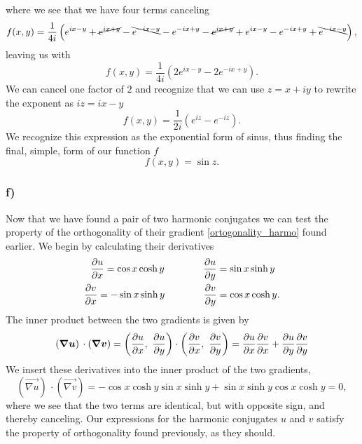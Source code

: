 \documentclass[12pt,twoside]{article}
\begin{document}
where we see that we have four terms canceling
\begin{equation}
  f(x, y) = \frac{1}{4i}\left(e^{ix-y}+\cancel{e^{ix+y}}-\bcancel{e^{-ix-y}}-e^{-ix+y} - \cancel{e^{ix+y}}+ e^{ix-y}-e^{-ix+y}+\bcancel{e^{-ix-y}}\right),
\end{equation}
leaving us with
\begin{equation}
  f(x, y) = \frac{1}{4i}\left(2e^{ix-y} - 2e^{-ix+y}\right).
\end{equation}
We can cancel one factor of $2$ and recognize that we can use $z=x+iy$ to rewrite the exponent as $iz=ix-y$
\begin{equation}
  f(x, y) = \frac{1}{2i}\left(e^{iz} - e^{-iz}\right).
\end{equation}
We recognize this expression as the exponential form of sinus, thus finding the final, simple, form of our function $f$
\begin{equation}
  f(x, y) = \sin{z}.
\end{equation}

\subsubsection*{f)}
Now that we have found a pair of two harmonic conjugates we can test the property of the orthogonality of their gradient \eqref{ortogonality_harmo} found earlier. We begin by calculating their derivatives
\begin{align}
  \begin{split}
  \pdv{u}{x} = \cos{x}\cosh{y}\qquad \qquad\pdv{u}{y} &= \sin{x}\sinh{y} \\
  \pdv{v}{x} = -\sin{x}\sinh{y}\qquad \qquad\pdv{v}{y} &= \cos{x}\cosh{y}. \label{derivatives_2}
\end{split}
\end{align}
The inner product between the two gradients is given by
\begin{equation}
  \left( {\boldsymbol{{ \nabla u}}} \right) \,\cdot   \left( {\boldsymbol{{ \nabla v}}} \right) = \left( \pdv{u}{x}, \,\, \pdv{u}{y} \right)\cdot \left( \pdv{v}{x}, \,\, \pdv{v}{y} \right) = \pdv{u}{x}\pdv{v}{x} + \pdv{u}{y}\pdv{v}{y}
\end{equation}
We insert these derivatives into the inner product of the two gradients,
\begin{equation}
  \left( \vec{ \nabla u} \right) \,\cdot   \left( \vec{ \nabla v} \right) = -\cos{x}\cosh{y}\sin{x}\sinh{y} + \sin{x}\sinh{y}\cos{x}\cosh{y} = 0,
\end{equation}
where we see that the two terms are identical, but with opposite sign, and thereby canceling. Our expressions for the harmonic conjugates $u$ and $v$ satisfy the property of orthogonality found previously, as they should.
\end{document}
